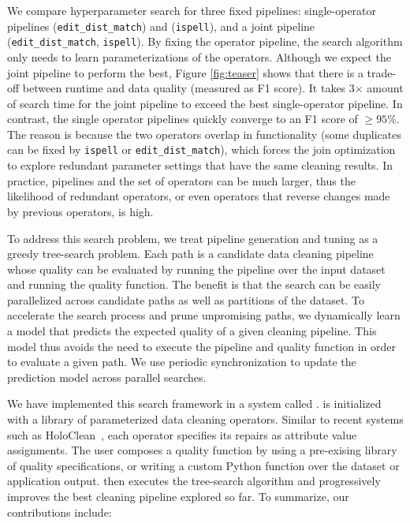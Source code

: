 We compare hyperparameter search for three fixed pipelines:  single-operator pipelines (\texttt{edit\_dist\_match}) and (\texttt{ispell}), and a joint pipeline (\texttt{edit\_dist\_match}, \texttt{ispell}).  By fixing the operator pipeline, the search algorithm only needs to learn parameterizations of the operators.  Although we expect the joint pipeline to perform the best, Figure \ref{fig:teaser} shows that there is a trade-off between runtime and data quality (measured as F1 score).  It takes 3$\times$ amount of search time for the joint pipeline to exceed the best single-operator pipeline.    In contrast, the single operator pipelines quickly converge to an F1 score of $\ge95\%$.  The reason is because the two operators overlap in functionality (some duplicates can be fixed by \texttt{ispell} or \texttt{edit\_dist\_match}), which forces the join optimization to explore redundant parameter settings that have the same cleaning results.  In practice, pipelines and the set of operators can be much larger, thus the likelihood of redundant operators, or even operators that reverse changes made by previous operators, is high.



To address this search problem, we treat pipeline generation and tuning as a greedy tree-search problem.   Each path is a candidate data cleaning pipeline whose quality can be evaluated by running the pipeline over the input dataset and running the quality function.  The benefit is that the search can be easily parallelized across candidate paths as well as partitions of the dataset.  To accelerate the search process and prune unpromising paths, we dynamically learn a model that predicts the expected quality of a given cleaning pipeline.  This model thus avoids the need to execute the pipeline and quality function in order to evaluate a given path.    We use periodic synchronization to update the prediction model across parallel searches.  

We have implemented this search framework in a system called \sys.  \sys is initialized with a library of parameterized data cleaning operators.  Similar to recent systems such as HoloClean~\cite{rekatsinas2017holoclean}, each operator specifies its repairs as attribute value assignments.  The user composes a quality function by using a pre-exising library of quality specifications, or writing a custom Python function over the dataset or application output.  \sys then executes the tree-search algorithm and progressively improves the best cleaning pipeline explored so far.  To summarize, our contributions include:


